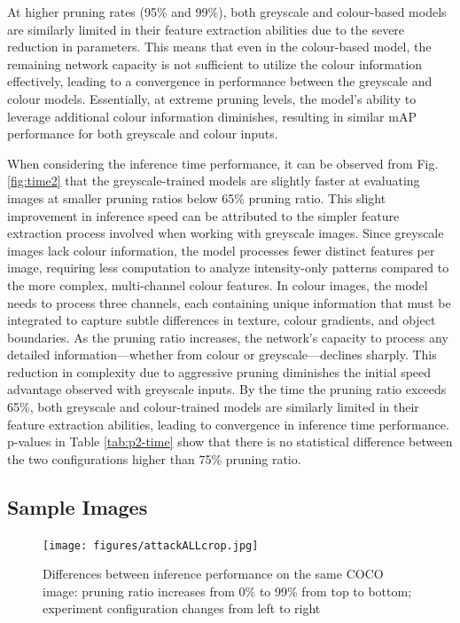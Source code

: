 \documentclass[journal,onecolumn,12pt]{IEEEtran}
\begin{document}
At higher pruning rates (95\% and 99\%), both greyscale and colour-based models are similarly limited in their feature extraction abilities due to the severe reduction in parameters. This means that even in the colour-based model, the remaining network capacity is not sufficient to utilize the colour information effectively, leading to a convergence in performance between the greyscale and colour models. Essentially, at extreme pruning levels, the model's ability to leverage additional colour information diminishes, resulting in similar mAP performance for both greyscale and colour inputs.

When considering the inference time performance, it can be observed from Fig. \ref{fig:time2} that the greyscale-trained models are slightly faster at evaluating images at smaller pruning ratios below 65\% pruning ratio. This slight improvement in inference speed can be attributed to the simpler feature extraction process involved when working with greyscale images. Since greyscale images lack colour information, the model processes fewer distinct features per image, requiring less computation to analyze intensity-only patterns compared to the more complex, multi-channel colour features. In colour images, the model needs to process three channels, each containing unique information that must be integrated to capture subtle differences in texture, colour gradients, and object boundaries. As the pruning ratio increases, the network's capacity to process any detailed information—whether from colour or greyscale—declines sharply. This reduction in complexity due to aggressive pruning diminishes the initial speed advantage observed with greyscale inputs. By the time the pruning ratio exceeds 65\%, both greyscale and colour-trained models are similarly limited in their feature extraction abilities, leading to convergence in inference time performance. p-values in Table \ref{tab:p2-time} show that there is no statistical difference between the two configurations higher than 75\% pruning ratio.

\subsection{Sample Images}

\begin{figure}
    \centering
    \captionsetup{justification=centering}
    \texttt{[image: figures/attackALLcrop.jpg]}
    \caption*{}
    \caption{Differences between inference performance on the same COCO image: pruning ratio increases from 0\% to 99\% from top to bottom; experiment configuration changes from left to right}
    \label{fig:attackAll}
\end{figure}
\end{document}

